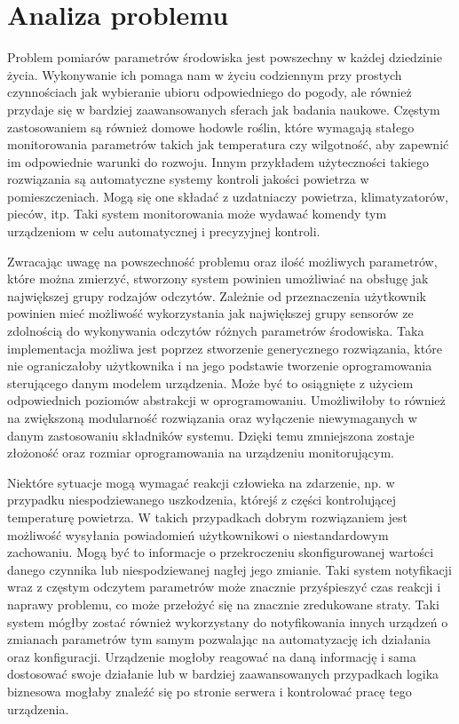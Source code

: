 \chapter{Analiza problemu}

Problem pomiarów parametrów środowiska jest powszechny w każdej dziedzinie życia.
Wykonywanie ich pomaga nam w życiu codziennym przy prostych czynnościach jak
wybieranie ubioru odpowiedniego do pogody, ale również przydaje się w bardziej
zaawansowanych sferach jak badania naukowe. Częstym zastosowaniem są również
domowe hodowle roślin, które wymagają stałego monitorowania parametrów
takich jak temperatura czy wilgotność, aby zapewnić im odpowiednie warunki
do rozwoju. Innym przykładem użyteczności takiego rozwiązania są automatyczne
systemy kontroli jakości powietrza w pomieszczeniach. Mogą się one składać
z uzdatniaczy powietrza, klimatyzatorów, pieców, itp. Taki system monitorowania
może wydawać komendy tym urządzeniom w celu automatycznej i precyzyjnej kontroli.

Zwracając uwagę na powszechność problemu oraz ilość możliwych parametrów,
które można zmierzyć, stworzony system powinien umożliwiać na obsługę jak 
największej grupy rodzajów odczytów. Zależnie od przeznaczenia użytkownik
powinien mieć możliwość wykorzystania jak największej grupy sensorów ze
zdolnością do wykonywania odczytów różnych parametrów środowiska.
Taka implementacja możliwa jest poprzez stworzenie generycznego rozwiązania, które
nie ograniczałoby użytkownika i na jego podstawie tworzenie oprogramowania
sterującego danym modelem urządzenia.
Może być to osiągnięte z użyciem odpowiednich poziomów abstrakcji w oprogramowaniu.
Umożliwiłoby to również na zwiększoną modularność rozwiązania oraz
wyłączenie niewymaganych w danym zastosowaniu składników systemu.
Dzięki temu zmniejszona zostaje złożoność oraz rozmiar oprogramowania
na urządzeniu monitorującym.

Niektóre sytuacje mogą wymagać reakcji człowieka na zdarzenie, np.
w przypadku niespodziewanego uszkodzenia, którejś z części kontrolującej
temperaturę powietrza. W takich przypadkach dobrym rozwiązaniem jest możliwość
wysyłania powiadomień użytkownikowi o niestandardowym zachowaniu.
Mogą być to informacje o przekroczeniu skonfigurowanej wartości danego czynnika
lub niespodziewanej nagłej jego zmianie. Taki system notyfikacji wraz z
częstym odczytem parametrów może znacznie przyśpieszyć czas reakcji
i naprawy problemu, co może przełożyć się na znacznie zredukowane straty.
Taki system mógłby zostać również wykorzystany do notyfikowania innych
urządzeń o zmianach parametrów tym samym pozwalając na automatyzację
ich działania oraz konfiguracji. Urządzenie mogłoby reagować na daną 
informację i sama dostosować swoje działanie lub w bardziej zaawansowanych
przypadkach logika biznesowa mogłaby znaleźć się po stronie serwera i 
kontrolować pracę tego urządzenia.

